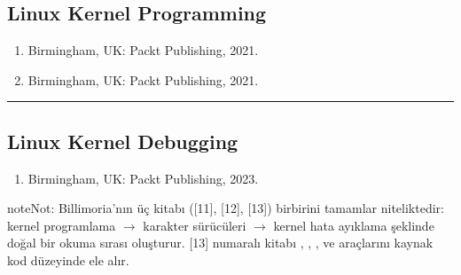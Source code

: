 \documentclass[a4paper,10pt,turkish]{sphinxmanual}
\begin{document}
\subsection{Linux Kernel Programming}
\label{\detokenize{introduction:linux-kernel-programming}}\begin{enumerate}
%
\item {} \begin{description}
\sphinxAtStartPar
Birmingham, UK: Packt Publishing, 2021.

\end{description}

\item {} \begin{description}
\sphinxAtStartPar
Birmingham, UK: Packt Publishing, 2021.

\end{description}

\end{enumerate}


\bigskip\hrule\bigskip



\subsection{Linux Kernel Debugging}
\label{\detokenize{introduction:linux-kernel-debugging}}\begin{enumerate}
%
\item {} \begin{description}
\sphinxAtStartPar
Birmingham, UK: Packt Publishing, 2023.

\end{description}

\end{enumerate}

\begin{sphinxadmonition}{note}{Not:}
\sphinxAtStartPar
Billimoria’nın üç kitabı ({[}11{]}, {[}12{]}, {[}13{]}) birbirini tamamlar
niteliktedir: kernel programlama \(\rightarrow\) karakter sürücüleri \(\rightarrow\) kernel hata
ayıklama şeklinde doğal bir okuma sırası oluşturur. {[}13{]} numaralı
 kitabı , , ,
 ve  araçlarını kaynak kod düzeyinde ele alır.
\end{sphinxadmonition}
\end{document}
